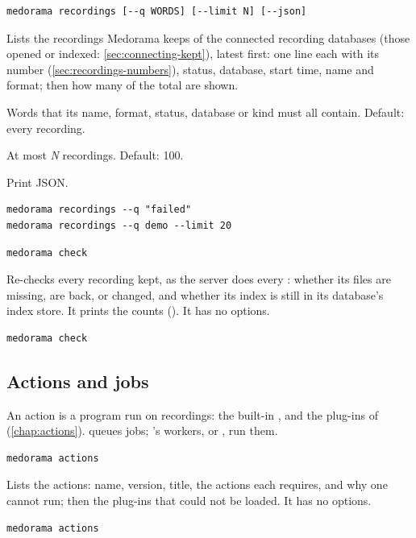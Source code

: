 \begin{lstlisting}[style=signature]
medorama recordings [--q WORDS] [--limit N] [--json]
\end{lstlisting}
Lists the recordings Medorama keeps of the connected recording databases (those opened or
indexed: \cref{sec:connecting-kept}), latest first: one line each with its
number (\cref{sec:recordings-numbers}), status, database, start time, name and format; then how
many of the total are shown.
\begin{params}
\item[--q WORDS] Words that its name, format, status, database or kind must all contain. Default:
  every recording.
\item[--limit N] At most \textit{N} recordings. Default: 100.
\item[--json] Print JSON.
\end{params}
\begin{lstlisting}[style=shell]
medorama recordings --q "failed"
medorama recordings --q demo --limit 20
\end{lstlisting}

\begin{lstlisting}[style=signature]
medorama check
\end{lstlisting}
Re-checks every recording kept, as the server does every : whether its files
are missing, are back, or changed, and whether its index is still in its database's index store.
It prints the counts (). It has no options.
\begin{lstlisting}[style=shell]
medorama check
\end{lstlisting}

\subsection{Actions and jobs}
\label{sec:cli-actions}

An action is a program run on recordings: the built-in , and the plug-ins of
 (\cref{chap:actions}).  queues jobs; 's workers, or
, run them.

\begin{lstlisting}[style=signature]
medorama actions
\end{lstlisting}
Lists the actions: name, version, title, the actions each requires, and why one cannot run; then
the plug-ins that could not be loaded. It has no options.
\begin{lstlisting}[style=shell]
medorama actions
\end{lstlisting}

